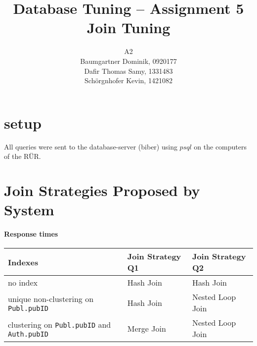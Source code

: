 \documentclass[11pt]{scrartcl}
\title{
  \textbf{\large Database Tuning -- Assignment 5}\\
  Join Tuning
}
\author{
A2\\
\large Baumgartner Dominik, 0920177 \\
\large Dafir Thomas Samy, 1331483 \\
\large Sch\"orgnhofer Kevin, 1421082
}
\begin{document}
\maketitle
\section{setup}
All queries were sent to the database-server (biber) using $psql$ on the computers of the R\"UR.

\section{Join Strategies Proposed by System}

\paragraph{Response times}

\begin{flushleft}
\begin{tabular}{l|l|l}
  Indexes & Join Strategy Q1 & Join Strategy Q2\\
  \hline
  no index & Hash Join & Hash Join  \\
  unique non-clustering on {\tt Publ.pubID} & Hash Join  & Nested Loop Join \\
  clustering on {\tt Publ.pubID} and {\tt Auth.pubID} & Merge Join & Nested Loop Join \\
\end{tabular}
\end{flushleft}
\end{document}

